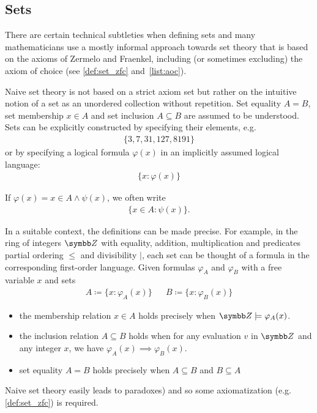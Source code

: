 \subsection{Sets}\label{sec:sets}

There are certain technical subtleties when defining sets and many mathematicians use a mostly informal approach towards set theory that is based on the axioms of Zermelo and Fraenkel, including (or sometimes excluding) the axiom of choice (see \ref{def:set_zfc} and~\cref{list:aoc}).

\begin{definition}\label{def:set_naive}\cite[Chapter 1]{Enderton1977}
  Naive set theory is not based on a strict axiom set but rather on the intuitive notion of a set as an unordered collection without repetition. Set equality \( A = B \), set membership \( x \in A \) and set inclusion \( A \subseteq B \) are assumed to be understood. Sets can be explicitly constructed by specifying their elements, e.g.
  \begin{align*}
    \{ 3, 7, 31, 127, 8191 \}
  \end{align*}
  or by specifying a logical formula \( \varphi(x) \) in an implicitly assumed logical language:
  \begin{align*}
    \{ x \colon \varphi(x) \}
  \end{align*}

  If \( \varphi(x) = x \in A \land \psi(x) \), we often write
  \begin{align*}
    \{ x \in A \colon \psi(x) \}.
  \end{align*}

  In a suitable context, the definitions can be made precise. For example, in the ring of integers \( \BB{Z} \) with equality, addition, multiplication and predicates partial ordering \( \leq \) and divisibility \( \vert \), each set can be thought of a formula in the corresponding first-order language. Given formulas \( \varphi_A \) and \( \varphi_B \) with a free variable \( x \) and sets
  \begin{align*}
    A \coloneqq \{ x \colon \varphi_A(x) \} && B \coloneqq \{ x \colon \varphi_B(x) \}
  \end{align*}

  \begin{itemize}
    \item the membership relation \( x \in A \) holds precisely when \( \BB{Z} \models \varphi_A(x) \).

    \item the inclusion relation \( A \subseteq B \) holds when for any evaluation \( v \) in \( \BB{Z} \) and any integer \( x \), we have \( \varphi_A(x) \implies \varphi_B(x) \).

    \item set equality \( A = B \) holds precisely when \( A \subseteq B \) and \( B \subseteq A \)
  \end{itemize}

  Naive set theory easily leads to paradoxes) and so some axiomatization (e.g. \cref{def:set_zfc}) is required.
\end{definition}

